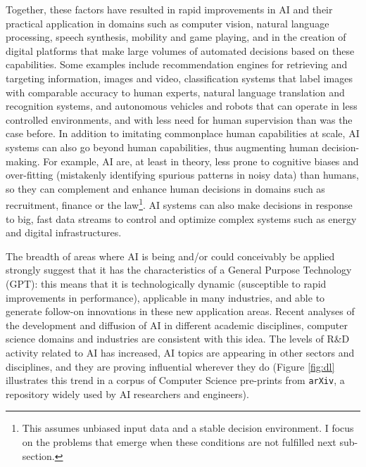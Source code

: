 \documentclass[11pt]{article}
\begin{document}
Together, these factors have resulted in rapid improvements in AI and their practical application in domains such as computer vision, natural language processing, speech synthesis, mobility and game playing, and in the creation of digital platforms that make large volumes of automated decisions based on these capabilities. Some examples include recommendation engines for retrieving and targeting information, images and video, classification systems that label images with comparable accuracy to human experts, natural language translation and recognition systems, and autonomous vehicles and robots that can operate in less controlled environments, and with less need for human supervision than was the case before. In addition to imitating commonplace human capabilities at scale, AI systems can also go beyond human capabilities, thus augmenting human decision-making. For example, AI are, at least in theory, less prone to cognitive biases and over-fitting (mistakenly identifying spurious patterns in noisy data) than humans, so they can complement and enhance human decisions in domains such as recruitment, finance or the law\footnote{This assumes unbiased input data and a stable decision environment. I focus on the problems that emerge when these conditions are not fulfilled next sub-section.}. AI systems can also make decisions in response to big, fast data streams to control and optimize complex systems such as energy and digital infrastructures.

The breadth of areas where AI is being and/or could conceivably be applied strongly suggest that it has the characteristics of a General Purpose Technology (GPT): this means that it is technologically dynamic (susceptible to rapid improvements in performance), applicable in many industries, and able to generate follow-on innovations in these new application areas. Recent analyses of the development and diffusion of AI in different academic disciplines, computer science domains and industries are consistent with this idea. The levels of R\&D activity related to AI has increased, AI topics are appearing in other sectors and disciplines, and they are proving influential wherever they do (Figure \ref{fig:dl} illustrates this trend in a corpus of Computer Science pre-prints from \texttt{arXiv}, a repository widely used by AI researchers and engineers). 
\end{document}
